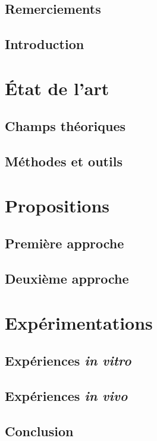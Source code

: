 \documentclass[12pt, english, fancyChapter, fancyPart, squeezeCommittee]{these-LUNAM-UBL}
\begin{document}

\chapter*{Remerciements}

\lipsum[1-2]

\chapter{Introduction}

\lipsum[1-6]

\part{État de l'art}

\chapter{Champs théoriques}

\lipsum[8-13]

\chapter{Méthodes et outils}

\lipsum[10-13]

\part{Propositions}

\chapter{Première approche}

\lipsum[17-21]

\chapter{Deuxième approche}

\lipsum[23-30]

\part{Expérimentations}

\chapter{Expériences \emph{in vitro}}

\lipsum[13-18]

\chapter{Expériences \emph{in vivo}}

\lipsum[22-32]

\chapter{Conclusion}


\lipsum[7-9]

\backmatter

\tableofcontents
\listoftables
\listoffigures
\end{document}
